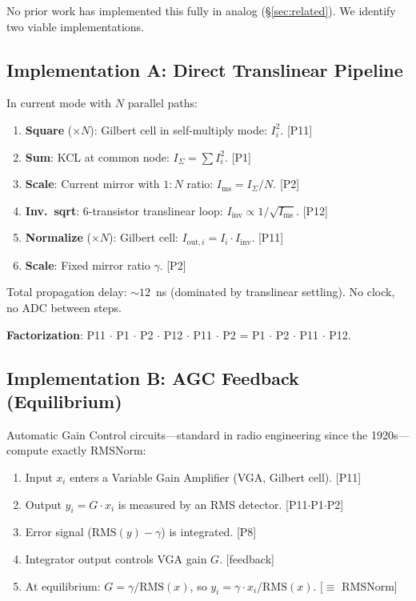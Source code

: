 \documentclass[11pt]{article}
\begin{document}
No prior work has implemented this fully in analog (\S\ref{sec:related}). We identify two viable implementations.

\subsection{Implementation A: Direct Translinear Pipeline}

In current mode with $N$ parallel paths:

\begin{enumerate}[leftmargin=*]
\item \textbf{Square} ($\times N$): Gilbert cell in self-multiply mode: $I_i^2$. \hfill [P11]
\item \textbf{Sum}: KCL at common node: $I_{\Sigma} = \sum I_i^2$. \hfill [P1]
\item \textbf{Scale}: Current mirror with $1{:}N$ ratio: $I_{\text{ms}} = I_{\Sigma}/N$. \hfill [P2]
\item \textbf{Inv.\ sqrt}: 6-transistor translinear loop: $I_{\text{inv}} \propto 1/\sqrt{I_{\text{ms}}}$. \hfill [P12]
\item \textbf{Normalize} ($\times N$): Gilbert cell: $I_{\text{out},i} = I_i \cdot I_{\text{inv}}$. \hfill [P11]
\item \textbf{Scale}: Fixed mirror ratio $\gamma$. \hfill [P2]
\end{enumerate}

Total propagation delay: ${\sim}12$~ns (dominated by translinear settling). No clock, no ADC between steps.

\textbf{Factorization}: P11 $\cdot$ P1 $\cdot$ P2 $\cdot$ P12 $\cdot$ P11 $\cdot$ P2 = P1 $\cdot$ P2 $\cdot$ P11 $\cdot$ P12.

\subsection{Implementation B: AGC Feedback (Equilibrium)}

Automatic Gain Control circuits---standard in radio engineering since the 1920s---compute exactly RMSNorm:

\begin{enumerate}[leftmargin=*]
\item Input $x_i$ enters a Variable Gain Amplifier (VGA, Gilbert cell). \hfill [P11]
\item Output $y_i = G \cdot x_i$ is measured by an RMS detector. \hfill [P11$\cdot$P1$\cdot$P2]
\item Error signal ($\text{RMS}(y) - \gamma$) is integrated. \hfill [P8]
\item Integrator output controls VGA gain $G$. \hfill [feedback]
\item At equilibrium: $G = \gamma / \text{RMS}(x)$, so $y_i = \gamma \cdot x_i / \text{RMS}(x)$. \hfill [$\equiv$ RMSNorm]
\end{enumerate}
\end{document}
